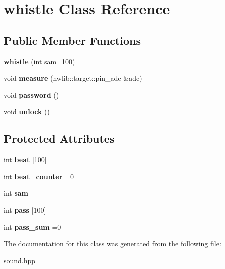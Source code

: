 \hypertarget{classwhistle}{}\section{whistle Class Reference}
\label{classwhistle}
\subsection*{Public Member Functions}
\begin{DoxyCompactItemize}
\item 
{\bfseries whistle} (int sam=100)\hypertarget{classwhistle_ac5f42abbcdd1cf0d5aad76da5a11dcff}{}\label{classwhistle_ac5f42abbcdd1cf0d5aad76da5a11dcff}

\item 
void {\bfseries measure} (hwlib\+::target\+::pin\+\_\+adc \&adc)\hypertarget{classwhistle_a8ef9d130002373c3b98d3eeb60f9811d}{}\label{classwhistle_a8ef9d130002373c3b98d3eeb60f9811d}

\item 
void {\bfseries password} ()\hypertarget{classwhistle_a6d16ac7911f43028e0ff19989558e906}{}\label{classwhistle_a6d16ac7911f43028e0ff19989558e906}

\item 
void {\bfseries unlock} ()\hypertarget{classwhistle_afe7de594839ac56b842b253ae8430379}{}\label{classwhistle_afe7de594839ac56b842b253ae8430379}

\end{DoxyCompactItemize}
\subsection*{Protected Attributes}
\begin{DoxyCompactItemize}
\item 
int {\bfseries beat} \mbox{[}100\mbox{]}\hypertarget{classwhistle_ae5a201150b83a25956b9a2191bd7482f}{}\label{classwhistle_ae5a201150b83a25956b9a2191bd7482f}

\item 
int {\bfseries beat\+\_\+counter} =0\hypertarget{classwhistle_a6ea69e699beb94b1e7a9bf5e709b4da8}{}\label{classwhistle_a6ea69e699beb94b1e7a9bf5e709b4da8}

\item 
int {\bfseries sam}\hypertarget{classwhistle_a195bb9da1a3705dc6955a33e1b0f4fb2}{}\label{classwhistle_a195bb9da1a3705dc6955a33e1b0f4fb2}

\item 
int {\bfseries pass} \mbox{[}100\mbox{]}\hypertarget{classwhistle_a47e435767da0ad753aa03a55050e88eb}{}\label{classwhistle_a47e435767da0ad753aa03a55050e88eb}

\item 
int {\bfseries pass\+\_\+sum} =0\hypertarget{classwhistle_a1c13c4d30f10fa7272bf90ac2117cd35}{}\label{classwhistle_a1c13c4d30f10fa7272bf90ac2117cd35}

\end{DoxyCompactItemize}


The documentation for this class was generated from the following file\+:\begin{DoxyCompactItemize}
\item 
sound.\+hpp\end{DoxyCompactItemize}
